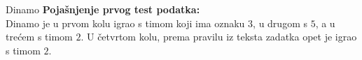 \begin{statement}[
  problempoints=20,
  timelimit=1 sekunda,
  memorylimit=512 MiB,
]{Dinamo}
\textbf{Pojašnjenje prvog test podatka:} \\
Dinamo je u prvom kolu igrao s timom koji ima oznaku $3$, u drugom s $5$, a u
trećem s timom $2$. U četvrtom kolu, prema pravilu iz teksta zadatka opet
je igrao s timom $2$.

\end{statement}

